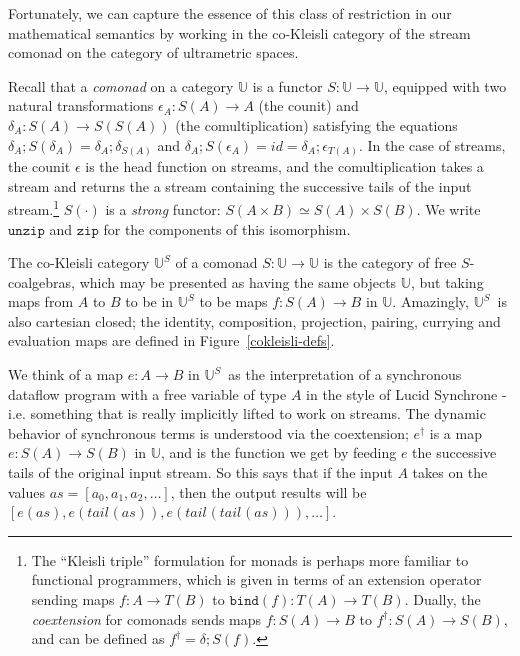 \documentclass[nocopyrightspace,preprint]{sigplanconf}
\newcommand{\ultrametric}{\mathbb{U}}
\newcommand{\term}[1]{\ensuremath{\mathtt{{#1}}}}
\newcommand{\counit}{\epsilon}
\newcommand{\tails}{\delta}
\newcommand{\tail}[2][]{\mathit{tail}^{#1}(#2)}
\begin{document}
Fortunately, we can capture the essence of this class of restriction
in our mathematical semantics by working in the co-Kleisli category of
the stream comonad on the category of ultrametric spaces.

Recall that a \emph{comonad} on a category $\ultrametric$
is a functor $S : \ultrametric \to \ultrametric$, equipped with two
natural transformations $\counit_A : S(A) \to A$ (the counit) and
$\tails_A : S(A) \to S(S(A))$ (the comultiplication) satisfying the
equations $\tails_A; S(\tails_A) = \tails_A; \tails_{S(A)}$ and
$\tails_A; S(\counit_A) = id = \tails_A; \counit_{T(A)}$. 
In
the case of streams, the counit $\counit$ is the head function on
streams, and the comultiplication takes a stream and returns the a
stream containing the successive tails of the input stream.\footnote{The ``Kleisli triple'' formulation for monads is perhaps
  more familiar to functional programmers, which is given in terms of
  an extension operator sending maps $f : A \to T(B)$ to $\term{bind}(f)  : T(A) \to
  T(B)$.  Dually, the \emph{coextension} for comonads sends maps $f :
  S(A) \to B$ to $f^\dagger : S(A) \to S(B)$, and can be defined as
  $f^\dagger = \delta; S(f)$.}
$S(\cdot)$ is a \emph{strong} functor: $S(A \times B) \simeq S(A) \times
S(B)$.
We write \term{unzip} and \term{zip} for the components
of this isomorphism.

\newcommand{\us}{$\ultrametric^S$} 
The co-Kleisli category
$\ultrametric^S$ of a comonad $S : \ultrametric \to \ultrametric$ is
the category of free $S$-coalgebras, which may be presented as having
the same objects $\ultrametric$, but taking maps from $A$ to $B$ to be
in $\ultrametric^S$ to be maps $f : S(A) \to B$ in
$\ultrametric$. Amazingly, \us\ is also cartesian closed; the
identity, composition, projection, pairing, currying and evaluation
maps are defined in Figure~\ref{cokleisli-defs}.

We think of a map $e : A \to B$ in \us\ as the interpretation of a
synchronous dataflow program with a free variable of type $A$ in the
style of Lucid Synchrone - i.e. something that is really implicitly
lifted to work on streams.
%
%
The dynamic behavior of synchronous terms is understood
via the coextension; $e^\dagger$ is a map $e : S(A) \to S(B)$ in
$\ultrametric$, and is the function we get by feeding
$e$ the successive tails of the original input stream. So this says
that if the input $A$ takes on the values $as = [a_0, a_1, a_2,
  \ldots]$, then the output results will be $[e(as), e(\tail{as}),
  e(\tail{\tail{as}}), \ldots]$.
\end{document}
